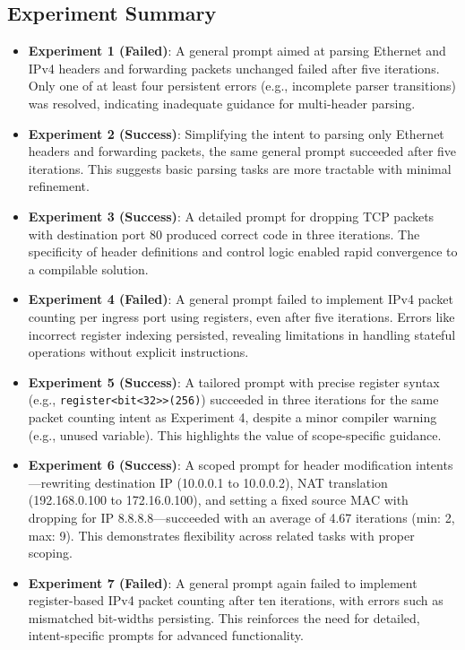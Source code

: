 \documentclass[sigconf]{acmart}
\begin{document}
\subsection*{Experiment Summary}
\begin{itemize}
    \item \textbf{Experiment 1 (Failed)}: A general prompt aimed at parsing Ethernet and IPv4 headers and forwarding packets unchanged failed after five iterations. Only one of at least four persistent errors (e.g., incomplete parser transitions) was resolved, indicating inadequate guidance for multi-header parsing.
    \item \textbf{Experiment 2 (Success)}: Simplifying the intent to parsing only Ethernet headers and forwarding packets, the same general prompt succeeded after five iterations. This suggests basic parsing tasks are more tractable with minimal refinement.
    \item \textbf{Experiment 3 (Success)}: A detailed prompt for dropping TCP packets with destination port 80 produced correct code in three iterations. The specificity of header definitions and control logic enabled rapid convergence to a compilable solution.
    \item \textbf{Experiment 4 (Failed)}: A general prompt failed to implement IPv4 packet counting per ingress port using registers, even after five iterations. Errors like incorrect register indexing persisted, revealing limitations in handling stateful operations without explicit instructions.
    \item \textbf{Experiment 5 (Success)}: A tailored prompt with precise register syntax (e.g., \texttt{register<bit<32>>(256)}) succeeded in three iterations for the same packet counting intent as Experiment 4, despite a minor compiler warning (e.g., unused variable). This highlights the value of scope-specific guidance.
    \item \textbf{Experiment 6 (Success)}: A scoped prompt for header modification intents—rewriting destination IP (10.0.0.1 to 10.0.0.2), NAT translation (192.168.0.100 to 172.16.0.100), and setting a fixed source MAC with dropping for IP 8.8.8.8—succeeded with an average of 4.67 iterations (min: 2, max: 9). This demonstrates flexibility across related tasks with proper scoping.
    \item \textbf{Experiment 7 (Failed)}: A general prompt again failed to implement register-based IPv4 packet counting after ten iterations, with errors such as mismatched bit-widths persisting. This reinforces the need for detailed, intent-specific prompts for advanced functionality.
\end{itemize}
\end{document}
